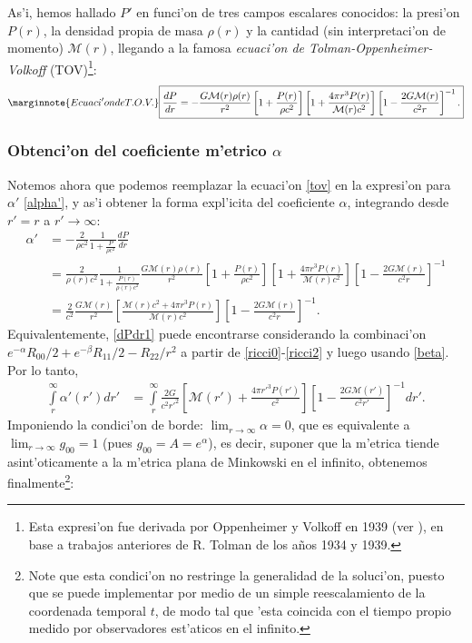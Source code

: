 As'i, hemos hallado $P'$ en funci'on de tres campos escalares conocidos: la presi'on $P(r)$, la densidad propia de masa $\rho(r)$ y la cantidad (sin interpretaci'on de momento) $\mathcal{M}(r)$, llegando a la famosa \textit{ecuaci'on de Tolman-Oppenheimer-Volkoff} (TOV)\footnote{Esta expresi'on fue derivada por Oppenheimer y Volkoff en 1939 (ver \cite{Oppenheimer39enero}), en base a trabajos anteriores de R. Tolman de los a\~nos 1934 y 1939.}:
\begin{equation}\label{tov}\marginnote{Ecuaci'on de T.O.V.}
\boxed{\frac{dP}{dr}=-\frac{G\mathcal{M}(r)\rho(r)}{r^2}\left[ 1+\frac{P(r)}{\rho c^2}\right]\left[ 1+\frac{4\pi r^3P(r)}{\mathcal{M}(r)c^2}\right]\left[ 1-\frac{2G\mathcal{M}(r)}{c^2r}\right]^{-1} .}
\end{equation}

\subsubsection{Obtenci'on del coeficiente m'etrico \texorpdfstring{$\alpha$}{a}}
 Notemos ahora que podemos reemplazar la ecuaci'on \eqref{tov} en la expresi'on para $\alpha'$ \eqref{alpha'}, y as'i obtener la forma expl'icita del coeficiente $\alpha$, integrando desde $r'=r$ a $r'\to\infty$:
\begin{align}
 \alpha'&=-\frac{2}{\rho c^2}\frac{1}{1+\frac{P}{\rho c^2}}\frac{dP}{dr}\\
&=\frac{2}{\rho(r) c^2}\frac{1}{1+\frac{P(r)}{\rho(r) c^2}}\frac{G\mathcal{M}(r)\rho(r)}{r^2}\left[ 1+\frac{P(r)}{\rho c^2}\right]\left[ 1+\frac{4\pi r^3P(r)}{\mathcal{M}(r)c^2}\right]\left[ 1-\frac{2G\mathcal{M}(r)}{c^2r}\right]^{-1}\\
&=\frac{2}{c^2}\frac{G\mathcal{M}(r)}{r^2}\left[ \frac{\mathcal{M}(r)c^2+4\pi r^3P(r)}{\mathcal{M}(r)c^2}\right]\left[ 1-\frac{2G\mathcal{M}(r)}{c^2r}\right]^{-1}. \label{dPdr1}
\end{align}
Equivalentemente, \eqref{dPdr1} puede encontrarse considerando la combinaci'on $e^{-\alpha}R_{00}/2+e^{-\beta}R_{11}/2-R_{22}/r^2$ a partir de \eqref{ricci0}-\eqref{ricci2} y luego usando \eqref{beta}. Por lo tanto,
\begin{align}
\int\limits_r^{\infty}\alpha'(r')dr'&=\int\limits_r^{\infty}\frac{2G}{c^2r'^2}\left[ \mathcal{M}(r')+\frac{4\pi r'^3P(r')}{c^2}\right]\left[ 1-\frac{2G\mathcal{M}(r')}{c^2r'}\right]^{-1}dr'.
\end{align}
Imponiendo la condici'on de borde: $\lim_{r\to\infty}\alpha=0$, que es equivalente a $\lim_{r\to\infty}g_{00}=1$ (pues $g_{00}=A=e^{\alpha}$), es decir, suponer que la m'etrica tiende asint'oticamente a la m'etrica plana de Minkowski en el infinito, obtenemos finalmente\footnote{Note que esta condici'on no restringe la generalidad de la soluci'on, puesto que se puede implementar por medio de un simple reescalamiento de la coordenada temporal $t$, de modo tal que 'esta coincida con el tiempo propio medido por observadores est'aticos en el infinito.}:
